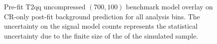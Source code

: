 \begin{figure}[!h]
{        \label{fig:T2qq_1fold_uncompressed_MR_4j}
    } \\
     ~~
     \\
    \caption{
        Pre-fit T2qq uncompressed $(700,100)$ benchmark model overlay on CR-only
        post-fit background prediction for all analysis bins. The uncertainty
        on the signal model counts represents the statistical uncertainty due
        to the finite size of the of the simulated sample.
    }
    \label{fig:T2qq_1fold_uncompressed_MR}
\end{figure}

